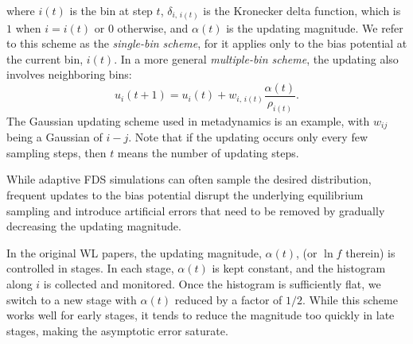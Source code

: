 \documentclass[reprint, superscriptaddress, floatfix]{revtex4-1}
\begin{document}
%
where $i(t)$ is the bin at step $t$,
$\delta_{i, \, i(t)}$ is the Kronecker delta function,
which is $1$ when $i = i(t)$ or $0$ otherwise,
and $\alpha(t)$ is the updating magnitude.
%
We refer to this scheme as the \emph{single-bin scheme},
for it applies only to the bias potential
at the current bin, $i(t)$.
%
In a more general \emph{multiple-bin scheme},
the updating also involves neighboring bins:
%
\begin{equation}
  u_i(t+1)
  =
  u_i(t)
  +
  w_{i, \, i(t)}
  \frac{ \alpha(t) }
       { \rho_{i(t)} }
  .
  \label{eq:mbin_update}
\end{equation}
%
The Gaussian updating scheme used in metadynamics
is an example, with $w_{ij}$ being a Gaussian of $i-j$.
%
Note that if the updating occurs
only every few sampling steps,
then $t$ means the number of updating steps.






While adaptive FDS simulations
can often sample the desired distribution,
frequent updates to the bias potential
disrupt the underlying equilibrium sampling
and introduce artificial errors that need to be
removed by gradually decreasing the updating magnitude\cite{
  belardinelli2007, *belardinelli2007jcp, *belardinelli2008, *belardinelli2016,
  zhou2005, morozov2007, zhou2008,
  laio2005, bussi2006, poulain2006, liang2007,
  crespo2010, *atchade2011, *fort2015}.
%





In the original WL papers\cite{
wang2001, *wang2001pre},
the updating magnitude, $\alpha(t)$,
(or $\ln f$ therein)
is controlled in stages.
%
In each stage, $\alpha(t)$
is kept constant,
and the histogram along $i$
is collected and monitored.
%
Once the histogram is sufficiently flat,
we switch to a new stage
with $\alpha(t)$ reduced by a factor of $1/2$\cite{
wang2001, *wang2001pre}.
%
While this scheme works well for early stages,
it tends to reduce the magnitude
too quickly in late stages, making the asymptotic error
saturate\cite{
belardinelli2007, *belardinelli2007jcp, *belardinelli2008, *belardinelli2016}.
\end{document}
